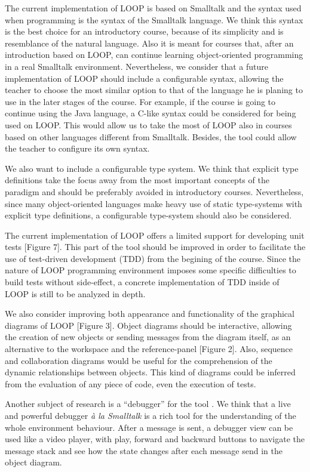 \documentclass{sigplanconf}
\begin{document}
The current implementation of LOOP is based on Smalltalk and the syntax used when programming is the syntax of the Smalltalk language. We think this syntax is the best choice for an introductory course, because of its simplicity and is resemblance of the natural language. Also it is meant for courses that, after an introduction based on LOOP, can continue learning object-oriented programming in a real Smalltalk environment. Nevertheless, we consider that a future implementation of LOOP should include a configurable syntax, allowing the teacher to choose the most similar option to that of the language he is planing to use in the later stages of the course. For example, if the course is going to continue using the Java language, a C-like syntax could be considered for being used on LOOP. This would allow us to take the most of LOOP also in courses based on other languages different from Smalltalk. Besides, the tool could allow the teacher to configure its own syntax.

We also want to include a configurable type system. We think that explicit type definitions take the focus away from the most important concepts of the paradigm and should be preferably avoided in introductory courses. Nevertheless, since many object-oriented languages make heavy use of static type-systems with explicit type definitions, a configurable type-system should also be considered.

The current implementation of LOOP offers a limited support for developing unit tests [Figure 7]. This part of the tool should be improved in order to facilitate the use of test-driven development (TDD) from the begining of the course. Since the nature of LOOP programming environment imposes some specific difficulties to build tests without side-effect, a concrete implementation of TDD inside of LOOP is still to be analyzed in depth.

We also consider improving both appearance and functionality of the graphical diagrams of LOOP [Figure 3]. Object diagrams should be interactive, allowing the creation of new objects or sending messages from the diagram itself, as an alternative to the workspace and the reference-panel [Figure 2]. Also, sequence and collaboration diagrams would be useful for the comprehension of the dynamic relationships between objects. This kind of diagrams could be inferred from the evaluation of any piece of code, even the execution of tests.

Another subject of research is a ``debugger'' for the tool \cite{Benn10}. We think that a live and powerful debugger \textit{à la Smalltalk} is a rich tool for the understanding of the whole environment behaviour. 
After a message is sent, a debugger view can be used like a video player, with play, forward and  backward buttons to navigate the message stack and see how the state changes after each message send in the object diagram.
\end{document}
